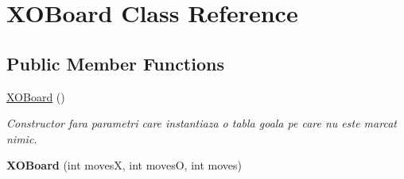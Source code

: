\hypertarget{classXOBoard}{
\section{XOBoard Class Reference}
\label{classXOBoard}
}
\subsection*{Public Member Functions}
\begin{DoxyCompactItemize}
\item 
\hypertarget{classXOBoard_a5740df9f6637e64adb7745228820b608}{
\hyperlink{classXOBoard_a5740df9f6637e64adb7745228820b608}{XOBoard} ()}
\label{classXOBoard_a5740df9f6637e64adb7745228820b608}

\begin{DoxyCompactList}\small\item\em Constructor fara parametri care instantiaza o tabla goala pe care nu este marcat nimic. \item\end{DoxyCompactList}\item 
\hypertarget{classXOBoard_a9cc0ccf792149ff4d2fb30f159b4331d}{
{\bfseries XOBoard} (int movesX, int movesO, int moves)}
\label{classXOBoard_a9cc0ccf792149ff4d2fb30f159b4331d}


\end{DoxyCompactItemize}
